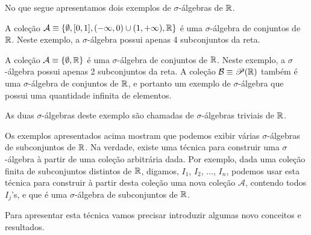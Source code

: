         No que segue apresentamos dois exemplos de $\sigma$-álgebras de $\mathbb{R}$.
        \begin{exemplo}\label{exemplo-sigma-algebra1}
            A coleção 
            $\mathcal{A}\equiv \{\emptyset, [0,1], (-\infty,0)\cup(1,+\infty),\mathbb{R}  \}$
            é uma $\sigma$-álgebra de conjuntos de $\mathbb{R}$.
            Neste exemplo, a $\sigma$-álgebra possui apenas 4 subconjuntos da reta. 
        \end{exemplo}
        \begin{exemplo}
            A coleção 
            $\mathcal{A}\equiv \{\emptyset, \mathbb{R}  \}$
            é uma $\sigma$-álgebra de conjuntos de $\mathbb{R}$.
            Neste exemplo, a $\sigma$-álgebra possui apenas 2 subconjuntos da reta. 
            A coleção $\mathcal{B}\equiv \mathscr{P}(\mathbb{R})$ também é uma $\sigma$-álgebra
            de conjuntos de $\mathbb{R}$, e portanto um exemplo de
            $\sigma$-álgebra que possui uma quantidade infinita de elementos.
            
            As duas $\sigma$-álgebras deste exemplo são chamadas de $\sigma$-álgebras triviais de $\mathbb{R}$.
        \end{exemplo}
        Os exemplos apresentados acima mostram que podemos exibir
        várias $\sigma$-álgebras de subconjuntos de $\mathbb{R}$. 
        Na verdade, existe uma técnica para construir uma $\sigma$-álgebra 
        à partir de uma coleção arbitrária dada. 
        Por exemplo, dada uma coleção finita de subconjuntos 
        distintos de $\mathbb{R}$, digamos, $I_1$, $I_2$, $\ldots$, $I_n$, 
        podemos usar esta técnica para construir à partir 
        desta coleção uma nova coleção $\mathcal{A}$, 
        contendo todos $I_j$'s, e que é uma $\sigma$-álgebra
        de subconjuntos de $\mathbb{R}$. 
    
        Para apresentar esta técnica vamos precisar introduzir algumas novo conceitos
        e resultados.
    
